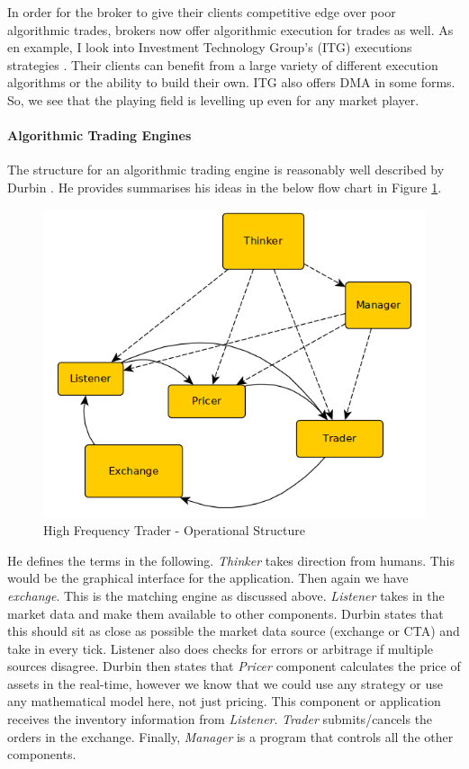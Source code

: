 \documentclass[12pt]{article}
\begin{document}
In order for the broker to give their clients competitive edge over poor algorithmic trades, brokers now offer algorithmic execution for trades as well. As en example, I look into Investment Technology Group's (ITG) executions strategies \cite{itg}. Their clients can benefit from a large variety of  different execution algorithms or the ability to build their own. ITG also offers DMA in some forms. So, we see that the playing field is levelling up even for any market player.

\paragraph{Algorithmic Trading Engines} The structure for an algorithmic trading engine is reasonably well described by Durbin \cite{durbin}. He provides summarises his ideas in the below flow chart in Figure \ref{fig:component}.

\begin{figure}[h!]
	\centering
    \includegraphics[scale=0.55]{component.png}
    \caption{High Frequency Trader - Operational Structure}
    \label{fig:component}
\end{figure}

He defines the terms in the following. \textit{Thinker} takes direction from humans. This would be the graphical interface for the application. Then again we have \textit{exchange}. This is the matching engine as discussed above. \textit{Listener} takes in the market data and make them available to other components. Durbin states that this should sit as close as possible the market data source (exchange or CTA) and take in every tick. Listener also does checks for errors or arbitrage if multiple sources disagree. Durbin then states that \textit{Pricer} component calculates the price of assets in the real-time, however we know that we could use any strategy or use any mathematical model here, not just pricing. This component or application receives the inventory information from \textit{Listener}. \textit{Trader} submits/cancels the orders in the exchange. Finally, \textit{Manager} is a program that controls all the other components.
\end{document}
